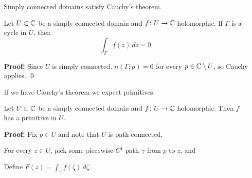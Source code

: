 \documentclass[10pt,aspectratio=169]{beamer}
\begin{document}
\begin{frame}
Simply connected domains satisfy Cauchy's theorem.

\begin{theorem}
Let $U \subset {\mathbb{C}}$ be a simply connected domain and $f \colon U \to {\mathbb{C}}$
holomorphic. \pause  If $\Gamma$ is a cycle in $U$, then
\[
\int_\Gamma f(z) \, dz = 0 .
\]
\end{theorem}

\pause

\textbf{Proof:} Since $U$ is simply connected, $n(\Gamma;p) = 0$ for every
$p \in {\mathbb{C}} \setminus U$, so Cauchy applies. \qed

\medskip
\pause

If we have Cauchy's theorem we expect primitives:

\begin{theorem}
Let $U \subset {\mathbb{C}}$ be a simply connected domain and
$f \colon U \to {\mathbb{C}}$ holomorphic. \pause  Then $f$ has a
primitive in $U$.
\end{theorem}

\pause

\textbf{Proof:}
Fix $p \in U$ and note that $U$ is path connected.

\pause
For every $z \in U$, pick
some piecewise-$C^1$ path $\gamma$ from $p$ to $z$, and

\pause
\medskip

Define \qquad
$\displaystyle
F(z) = \int_\gamma f(\zeta) \, d\zeta .
$
\end{frame}
\end{document}
